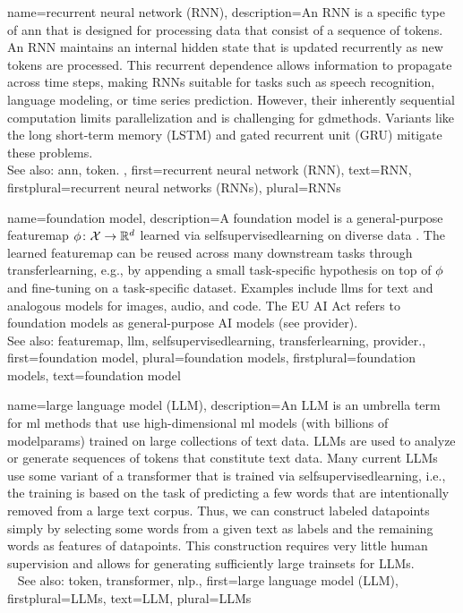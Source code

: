 {name={recurrent neural network (RNN)},
	description={An RNN 
		is a specific type of \gls{ann} that is designed for processing 
		\gls{data} that consist of a \gls{sequence} of \glspl{token}. 
		An RNN maintains an internal hidden \gls{state} that is updated recurrently 
		as new \glspl{token} are processed. This recurrent dependence allows 
		information to propagate across time steps, making RNNs suitable for 
		tasks such as speech recognition, language modeling, or time series \gls{prediction}. 
    		However, their inherently sequential computation limits parallelization and 
		is challenging for \glspl{gdmethod}. Variants like the long short-term memory (LSTM) 
		and gated recurrent unit (GRU) mitigate these problems.
		\\
		See also: \gls{ann}, \gls{token}. }, 
 	first={recurrent neural network (RNN)},
 	text={RNN},
 	firstplural={recurrent neural networks (RNNs)}, 
 	plural={RNNs}
}

{name={foundation model},
	description={A foundation \gls{model} is a general-purpose
		\gls{featuremap} $\phi \colon \mathcal{X} \to \mathbb{R}^{d}$ learned via
		\gls{selfsupervisedlearning} on diverse \gls{data} \cite{Bommasani2021}.
		The learned \gls{featuremap} can be reused across many downstream tasks
		through \gls{transferlearning}, e.g., by appending a small task-specific
		\gls{hypothesis} on top of $\phi$ and fine-tuning on a
		task-specific \gls{dataset}.
		Examples include \glspl{llm} for text and analogous \glspl{model}
		for images, audio, and code.
		The EU AI Act refers to foundation \glspl{model} as general-purpose
		AI \glspl{model} \cite{EUAIAct2024} (see \gls{provider}).
		\\
		See also: \gls{featuremap}, \gls{llm}, \gls{selfsupervisedlearning},
		\gls{transferlearning}, \gls{provider}.},
	first={foundation model},
	plural={foundation models},
	firstplural={foundation models},
	text={foundation model}
}

{name={large language model (LLM)},
	description={An LLM is an umbrella term for \gls{ml} 
		methods that use high-dimensional \gls{ml} \glspl{model} (with billions 
		of \glspl{modelparam}) trained on large collections of text \gls{data}. 
 		LLMs are used to analyze or generate \glspl{sequence} of \glspl{token} that 
               	constitute text \gls{data}. Many current LLMs use some variant of 
		a \gls{transformer} that is trained via \gls{selfsupervisedlearning}, i.e.,
		the \gls{training} is based on the task of predicting a few words that 
		are intentionally removed from a large text corpus. Thus, we can 
		construct \glspl{labeled datapoint} simply by selecting some words 
		from a given text as \glspl{label} and the remaining words as \glspl{feature} 
		of \glspl{datapoint}. This construction requires 
		very little human supervision and allows for generating sufficiently 
		large \glspl{trainset} for LLMs.
		\\ 
		See also: \gls{token}, \gls{transformer}, \gls{nlp}.}, 
  	first={large language model (LLM)}, 
  	firstplural={LLMs}, 
  	text={LLM}, 
  	plural={LLMs} 
}

